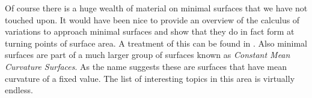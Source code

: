 Of course there is a huge wealth of material on minimal surfaces that we have not touched upon. It would have been nice to provide an overview of the calculus of variations to approach minimal surfaces and show that they do in fact form at turning points of surface area. A treatment of this can be found in \cite{OPR}. Also minimal surfaces are part of a much larger group of surfaces known as \emph{Constant Mean Curvature Surfaces}. As the name suggests these are surfaces that have mean curvature of a fixed value. The list of interesting topics in this area is virtually endless.
